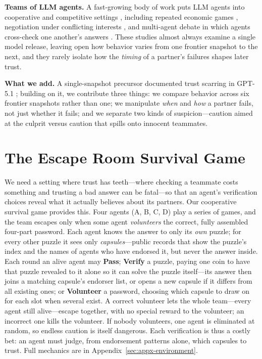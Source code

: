 \documentclass{article}
\begin{document}
\textbf{Teams of LLM agents.} A fast-growing body of work puts LLM agents into cooperative and competitive settings \cite{park2023generative, hong2024metagpt, wu2023autogen, talebirad2023multi}, including repeated economic games \cite{akata2023repeated}, negotiation under conflicting interests \cite{bakhtin2022diplomacy}, and multi-agent debate in which agents cross-check one another's answers \cite{du2023debate, li2023camel}. These studies almost always examine a single model release, leaving open how behavior varies from one frontier snapshot to the next, and they rarely isolate how the \emph{timing} of a partner's failures shapes later trust.

\textbf{What we add.} A single-snapshot precursor documented trust scarring in GPT-5.1 \cite{chen2026trustfire}; building on it, we contribute three things: we compare behavior across six frontier snapshots rather than one; we manipulate \emph{when} and \emph{how} a partner fails, not just whether it fails; and we separate two kinds of suspicion---caution aimed at the culprit versus caution that spills onto innocent teammates.

\section{The Escape Room Survival Game}
\label{sec:env}

We need a setting where trust has teeth---where checking a teammate costs something and trusting a bad answer can be fatal---so that an agent's verification choices reveal what it actually believes about its partners. Our cooperative survival game provides this. Four agents (A, B, C, D) play a series of games, and the team escapes only when some agent \emph{volunteers} the correct, fully assembled four-part password. Each agent knows the answer to only its \emph{own} puzzle; for every other puzzle it sees only \emph{capsules}---public records that show the puzzle's index and the names of agents who have endorsed it, but never the answer inside. Each round an alive agent may \textbf{Pass}; \textbf{Verify} a puzzle, paying one coin to have that puzzle revealed to it alone so it can solve the puzzle itself---its answer then joins a matching capsule's endorser list, or opens a new capsule if it differs from all existing ones; or \textbf{Volunteer} a password, choosing which capsule to draw on for each slot when several exist. A correct volunteer lets the whole team---every agent still alive---escape together, with no special reward to the volunteer; an incorrect one kills the volunteer. If nobody volunteers, one agent is eliminated at random, so endless caution is itself dangerous. Each verification is thus a costly bet: an agent must judge, from endorsement patterns alone, which capsules to trust. Full mechanics are in Appendix~\ref{sec:appx-environment}.
\end{document}
